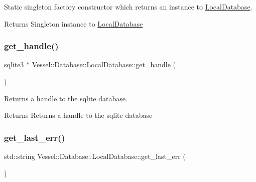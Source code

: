 Static singleton factory constructor which returns an instance to \hyperlink{class_vessel_1_1_database_1_1_local_database}{Local\+Database}. 

\begin{DoxyReturn}{Returns}
Singleton instance to \hyperlink{class_vessel_1_1_database_1_1_local_database}{Local\+Database} 
\end{DoxyReturn}
\mbox{\label{class_vessel_1_1_database_1_1_local_database_a7df737694e981572b00a3a9b9d0a7eeb}} 
\subsubsection{\texorpdfstring{get\+\_\+handle()}{get\_handle()}}
{\footnotesize\ttfamily sqlite3 $\ast$ Vessel\+::\+Database\+::\+Local\+Database\+::get\+\_\+handle (\begin{DoxyParamCaption}{ }\end{DoxyParamCaption})}



Returns a handle to the sqlite database. 

\begin{DoxyReturn}{Returns}
Returns a handle to the sqlite database 
\end{DoxyReturn}
\mbox{\label{class_vessel_1_1_database_1_1_local_database_a2604bed46b522977ba77140626282f3d}} 
\subsubsection{\texorpdfstring{get\+\_\+last\+\_\+err()}{get\_last\_err()}}
{\footnotesize\ttfamily std\+::string Vessel\+::\+Database\+::\+Local\+Database\+::get\+\_\+last\+\_\+err (\begin{DoxyParamCaption}{ }\end{DoxyParamCaption})}



